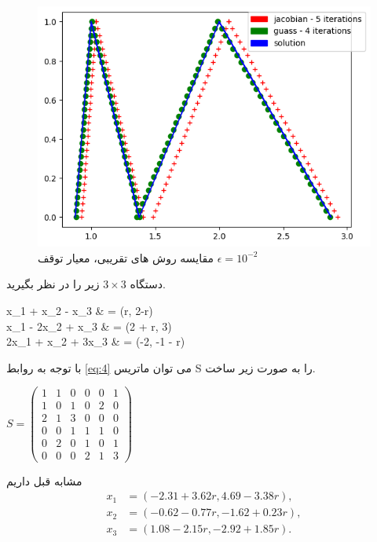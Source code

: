 \begin{figure}[h] 
	\center 
	\includegraphics[width=0.7\linewidth]{assets/ex_1.png}
	\caption{مقایسه روش های تقریبی، معیار توقف $ \epsilon = 10^{-2} $}
\end{figure}

\begin{example}
	دستگاه  $3 \times 3 $ زیر را در نظر بگیرید. \\
	\begin{flalign}
	x_1 + x_2 - x_3  & = (r, 2-r) \nonumber\\
	x_1 - 2x_2 + x_3 & = (2 + r, 3)\nonumber\\
	2x_1 + x_2 + 3x_3 & = (-2, -1 - r)\nonumber
	\end{flalign}
\end{example}
با توجه به روابط \ref{eq:4} می توان ماتریس S را به صورت زیر ساخت.\\
\begin{center}
	$
	S = 
	\begin{pmatrix}
	1 & 1 & 0 & 0 & 0 & 1\\
	1 & 0 & 1 & 0 & 2 & 0\\
	2 & 1 & 3 & 0 & 0 & 0\\
	0 & 0 & 1 & 1 & 1 & 0\\
	0 & 2 & 0 & 1 & 0 & 1\\
	0 & 0 & 0 & 2 & 1 & 3
	\end{pmatrix}
	$
\end{center}
مشابه قبل داریم \\
\begin{align}
x_1 & = ( -2.31 + 3.62r,  4.69 - 3.38r),\nonumber\\
x_2 & = ( -0.62 - 0.77r, -1.62 + 0.23r),\nonumber\\
x_3 & = (  1.08 - 2.15r, -2.92 + 1.85r).\nonumber
\end{align}




